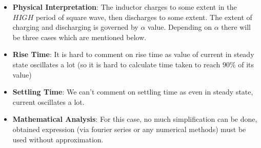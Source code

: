 \documentclass[12pt,a4paper]{report}
\begin{document}
\begin{itemize}
    \item \textbf{Physical Interpretation}: The inductor charges to some extent in the $HIGH$ period of square wave, then discharges to some extent. The extent of charging and discharging is governed by $\alpha$ value. Depending on $\alpha$ there will be three cases which are mentioned below.
    \item \textbf{Rise Time}: It is hard to comment on rise time as value of current in steady state oscillates a lot (so it is hard to calculate time taken to reach $90\%$ of its value)
    \item \textbf{Settling Time}: We can't comment on settling time as even in steady state, current oscillates a lot.
    \item \textbf{Mathematical Analysis}: For this case, no much simplification can be done, obtained expression (via fourier series or any numerical methods) must be used without approximation.
    

\end{itemize}
\end{document}
